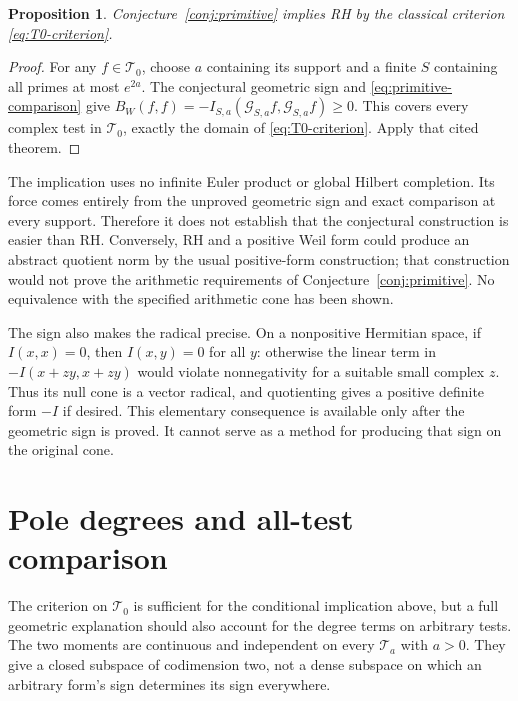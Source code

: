 \documentclass[11pt,letterpaper]{article}
\newtheorem{proposition}[theorem]{Proposition}
\theoremstyle{definition}
\theoremstyle{remark}
\newcommand{\T}{\mathcal T}
\begin{document}
\begin{proposition}\label{prop:RH-consequence}
Conjecture~\ref{conj:primitive} implies RH by the classical
criterion \eqref{eq:T0-criterion}.
\end{proposition}
\begin{proof}
For any $f\in\T_0$, choose $a$ containing its support and a
finite $S$ containing all primes at most $e^{2a}$. The conjectural
geometric sign and \eqref{eq:primitive-comparison} give
$B_W(f,f)=-I_{S,a}(\mathcal G_{S,a}f,\mathcal G_{S,a}f)\ge0$.
This covers every complex test in $\T_0$, exactly the domain of
\eqref{eq:T0-criterion}. Apply that cited theorem.
\end{proof}

The implication uses no infinite Euler product or global Hilbert
completion. Its force comes entirely from the unproved geometric
sign and exact comparison at every support. Therefore it does
not establish that the conjectural construction is easier than
RH. Conversely, RH and a positive Weil form could produce an
abstract quotient norm by the usual positive-form construction;
that construction would not prove the arithmetic requirements
of Conjecture~\ref{conj:primitive}. No equivalence with the
specified arithmetic cone has been shown.

The sign also makes the radical precise. On a nonpositive
Hermitian space, if $I(x,x)=0$, then $I(x,y)=0$ for all $y$:
otherwise the linear term in $-I(x+zy,x+zy)$ would violate
nonnegativity for a suitable small complex $z$. Thus its null
cone is a vector radical, and quotienting gives a positive
definite form $-I$ if desired. This elementary consequence is
available only after the geometric sign is proved. It cannot
serve as a method for producing that sign on the original cone.

\section{Pole degrees and all-test comparison}

The criterion on $\T_0$ is sufficient for the conditional
implication above, but a full geometric explanation should also
account for the degree terms on arbitrary tests. The two moments
are continuous and independent on every $\T_a$ with $a>0$.
They give a closed subspace of codimension two, not a dense
subspace on which an arbitrary form's sign determines its sign
everywhere.
\end{document}
